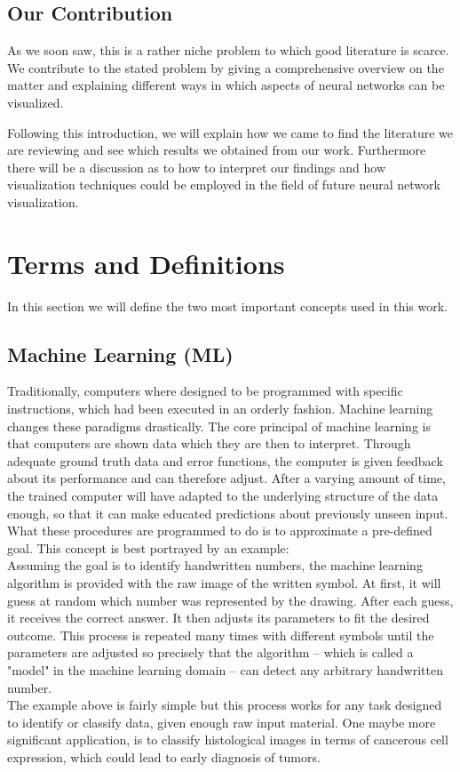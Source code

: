 \documentclass{acmsiggraph}               %
\begin{document}
\subsection{Our Contribution}
As we soon saw, this is a rather niche problem to which good literature is scarce. We contribute to the stated problem by giving a comprehensive overview on the matter and explaining different ways in which aspects of neural networks can be visualized.

Following this introduction, we will explain how we came to find the literature we are reviewing and see which results we obtained from our work. Furthermore there will be a discussion as to how to interpret our findings and how visualization techniques could be employed in the field of future neural network visualization.

\section{Terms and Definitions}
In this section we will define the two most important concepts used in this work.

\subsection{Machine Learning (ML)}
Traditionally, computers where designed to be programmed with specific instructions, which had been executed in an orderly fashion.
Machine learning changes these paradigms drastically. The core principal of machine learning is that computers are shown data which they are then to interpret. Through adequate ground truth data and error functions, the computer is given feedback about its performance and can therefore adjust. After a varying amount of time, the trained computer will have adapted to the underlying structure of the data enough, so that it can make educated predictions about previously unseen input. What these procedures are programmed to do is to approximate a pre-defined goal. This concept is best portrayed by an example:\\
Assuming the goal is to identify handwritten numbers, the machine learning algorithm is provided with the raw image of the written symbol. At first, it will guess at random which number was represented by the drawing. 
After each guess, it receives the correct answer. It then adjusts its parameters to fit the desired outcome.
This process is repeated many times with different symbols until the parameters are adjusted so precisely that the algorithm -- which is called a "model" in the machine learning domain -- can detect any arbitrary handwritten number.\\
The example above is fairly simple but this process works for any task designed to identify or classify data, given enough raw input material. One maybe more significant application, is to classify histological images in terms of cancerous cell expression, which could lead to early diagnosis of tumors.
\end{document}
